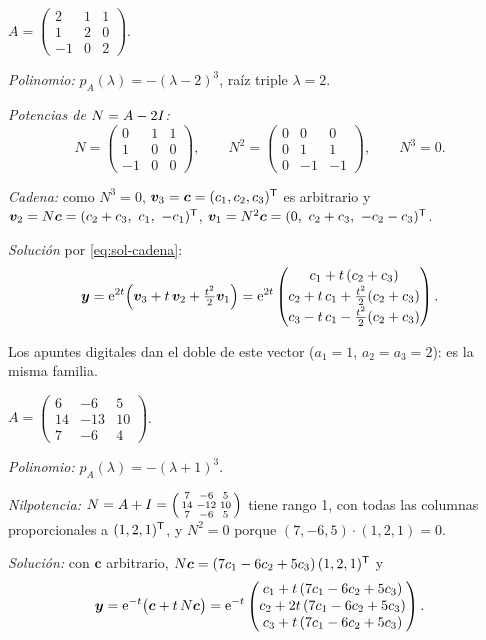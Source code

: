 \documentclass[11pt,twoside]{article}
\newcommand\vy{\bm{y}}
\newcommand\vv{\bm{v}}
\newcommand\vc{\bm{c}}
\newcommand\mat[1]{\begin{pmatrix}#1\end{pmatrix}}
\newcommand\smat[1]{\left(\begin{smallmatrix}#1\end{smallmatrix}\right)}
\begin{document}
\begin{ejemplo}\label{ej:2-2}
$A=\smat{2&1&1\\1&2&0\\-1&0&2}$.
\begin{pasos}
\item \emph{Polinomio:} $p_A(\lambda)=-(\lambda-2)^3$, raíz triple $\lambda=2$.
\item \emph{Potencias de $N=A-2I$:}
\begin{equation*}
N=\mat{0&1&1\\1&0&0\\-1&0&0},\qquad
N^2=\mat{0&0&0\\0&1&1\\0&-1&-1},\qquad N^3=0 .
\end{equation*}
\item \emph{Cadena:} como $N^3=0$, $\vv_3=\vc=(c_1,c_2,c_3)\T$ es arbitrario y
$\vv_2=N\vc=(c_2+c_3,\ c_1,\ -c_1)\T$, $\vv_1=N^2\vc=(0,\ c_2+c_3,\ -c_2-c_3)\T$.
\item \emph{Solución} por \eqref{eq:sol-cadena}:
\begin{equation*}
\vy=\e^{2t}\Big(\vv_3+t\,\vv_2+\tfrac{t^2}{2}\vv_1\Big)
=\e^{2t}\mat{c_1+t\,(c_2+c_3)\\[1pt] c_2+t\,c_1+\tfrac{t^2}{2}(c_2+c_3)\\[1pt] c_3-t\,c_1-\tfrac{t^2}{2}(c_2+c_3)}.
\end{equation*}
\end{pasos}
Los apuntes digitales dan el doble de este vector ($a_1=1$, $a_2=a_3=2$): es la misma familia.
\end{ejemplo}

\begin{ejemplo}\label{ej:2-3}
$A=\smat{6&-6&5\\14&-13&10\\7&-6&4}$.
\begin{pasos}
\item \emph{Polinomio:} $p_A(\lambda)=-(\lambda+1)^3$.
\item \emph{Nilpotencia:} $N=A+\Id=\smat{7&-6&5\\14&-12&10\\7&-6&5}$ tiene rango 1, con todas las columnas
proporcionales a $(1,2,1)^{\mathsf T}$, y $N^2=0$ porque $(7,-6,5)\cdot(1,2,1)=0$.
\item \emph{Solución:} con $\vc$ arbitrario, $N\vc=(7c_1-6c_2+5c_3)\,(1,2,1)\T$ y
\begin{equation*}
\vy=\e^{-t}\big(\vc+t\,N\vc\big)=\e^{-t}\mat{c_1+t\,(7c_1-6c_2+5c_3)\\ c_2+2t\,(7c_1-6c_2+5c_3)\\ c_3+t\,(7c_1-6c_2+5c_3)}.
\end{equation*}
\end{pasos}
\end{ejemplo}
\end{document}
